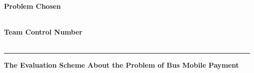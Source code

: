 \documentclass[../mcmpaper]{subfiles}
\begin{document}
	\thispagestyle{empty}
	\begingroup
	\setlength{\parindent}{0pt}
	\begin{minipage}[t]{0.33\linewidth}
		\bfseries\centering%
		Problem Chosen\\[0.7pc]
		{\Huge\textbf{\problem}}\\[2.8pc]
	\end{minipage}%
	\begin{minipage}[t]{0.33\linewidth}
		\centering%
		\textbf{\headset}%
	\end{minipage}%
	\begin{minipage}[t]{0.33\linewidth}
		\centering\bfseries%
		Team Control Number\\[0.7pc]
		{\Huge\textbf{\MCMcontrol}}\\[2.8pc]
	\end{minipage}\par
	\rule{\linewidth}{0.8pt}\par
	\par
	\endgroup
    \begin{center}
    \Large\bfseries The Evaluation Scheme About the Problem of Bus Mobile Payment
    \end{center}
\end{document}
